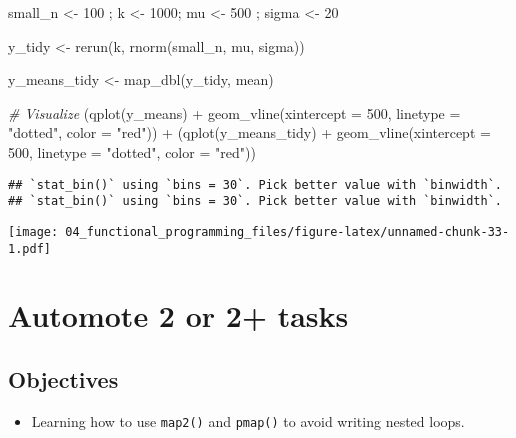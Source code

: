 \documentclass[
]{book}
\newenvironment{Shaded}{\begin{snugshade}}{\end{snugshade}}
\newcommand{\AttributeTok}[1]{\textcolor[rgb]{0.77,0.63,0.00}{#1}}
\newcommand{\CommentTok}[1]{\textcolor[rgb]{0.56,0.35,0.01}{\textit{#1}}}
\newcommand{\DecValTok}[1]{\textcolor[rgb]{0.00,0.00,0.81}{#1}}
\newcommand{\FunctionTok}[1]{\textcolor[rgb]{0.00,0.00,0.00}{#1}}
\newcommand{\NormalTok}[1]{#1}
\newcommand{\OtherTok}[1]{\textcolor[rgb]{0.56,0.35,0.01}{#1}}
\newcommand{\SpecialCharTok}[1]{\textcolor[rgb]{0.00,0.00,0.00}{#1}}
\newcommand{\StringTok}[1]{\textcolor[rgb]{0.31,0.60,0.02}{#1}}
\providecommand{\tightlist}{%
  \setlength{\itemsep}{0pt}\setlength{\parskip}{0pt}}
\begin{document}
\begin{Shaded}
\begin{Highlighting}[]
\NormalTok{small\_n }\OtherTok{\textless{}{-}} \DecValTok{100}\NormalTok{ ; k }\OtherTok{\textless{}{-}} \DecValTok{1000}\NormalTok{; mu }\OtherTok{\textless{}{-}} \DecValTok{500}\NormalTok{ ; sigma }\OtherTok{\textless{}{-}} \DecValTok{20} 

\NormalTok{y\_tidy }\OtherTok{\textless{}{-}} \FunctionTok{rerun}\NormalTok{(k, }\FunctionTok{rnorm}\NormalTok{(small\_n, mu, sigma)) }

\NormalTok{y\_means\_tidy }\OtherTok{\textless{}{-}} \FunctionTok{map\_dbl}\NormalTok{(y\_tidy, mean)}

\CommentTok{\# Visualize }
\NormalTok{(}\FunctionTok{qplot}\NormalTok{(y\_means) }\SpecialCharTok{+}
   \FunctionTok{geom\_vline}\NormalTok{(}\AttributeTok{xintercept =} \DecValTok{500}\NormalTok{, }\AttributeTok{linetype =} \StringTok{"dotted"}\NormalTok{, }\AttributeTok{color =} \StringTok{"red"}\NormalTok{)) }\SpecialCharTok{+}
\NormalTok{(}\FunctionTok{qplot}\NormalTok{(y\_means\_tidy) }\SpecialCharTok{+}
   \FunctionTok{geom\_vline}\NormalTok{(}\AttributeTok{xintercept =} \DecValTok{500}\NormalTok{, }\AttributeTok{linetype =} \StringTok{"dotted"}\NormalTok{, }\AttributeTok{color =} \StringTok{"red"}\NormalTok{))}
\end{Highlighting}
\end{Shaded}

\begin{verbatim}
## `stat_bin()` using `bins = 30`. Pick better value with `binwidth`.
## `stat_bin()` using `bins = 30`. Pick better value with `binwidth`.
\end{verbatim}

\texttt{[image: 04\_functional\_programming\_files/figure-latex/unnamed-chunk-33-1.pdf]}

\hypertarget{map2}{%
\section{Automote 2 or 2+ tasks}\label{map2}}

\hypertarget{objectives-2}{%
\subsection{Objectives}\label{objectives-2}}

\begin{itemize}
\tightlist
\item
  Learning how to use \texttt{map2()} and \texttt{pmap()} to avoid writing nested loops.
\end{itemize}
\end{document}

